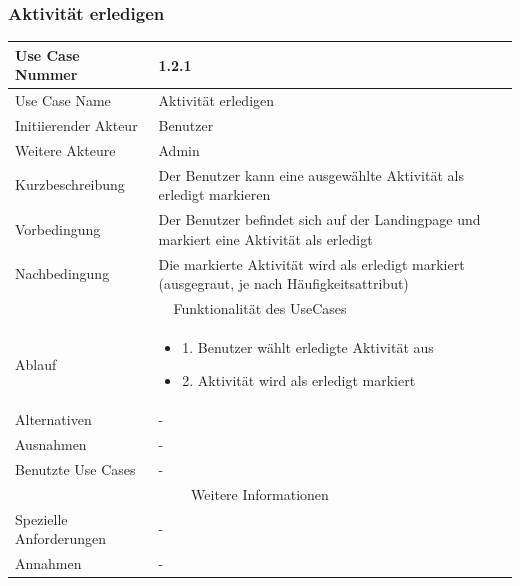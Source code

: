 \documentclass[10pt,a4paper]{article}
\begin{document}
		\subsubsection{Aktivität erledigen}
		\begin{tabular}{|l|p{.5\linewidth}|}
			\hline Use Case Nummer & 1.2.1 \\ 
			\hline Use Case Name & Aktivität erledigen \\ 
			\hline Initiierender Akteur & Benutzer \\
			\hline Weitere Akteure & Admin \\
			\hline Kurzbeschreibung & Der Benutzer kann eine ausgewählte Aktivität als erledigt markieren \\
			\hline Vorbedingung & Der Benutzer befindet sich auf der Landingpage und markiert eine Aktivität als erledigt \\
			\hline Nachbedingung & Die markierte Aktivität wird als erledigt markiert (ausgegraut, je nach Häufigkeitsattribut) \\
			\hline \multicolumn{2}{|c|}{Funktionalität des UseCases}\\
			\hline Ablauf & \begin{itemize}
				\item 1. Benutzer wählt erledigte Aktivität aus
				\item 2. Aktivität wird als erledigt markiert
			\end{itemize} \\
			\hline Alternativen & - \\
			\hline Ausnahmen & - \\
			\hline Benutzte Use Cases & - \\
			\hline \multicolumn{2}{|c|}{Weitere Informationen} \\
			\hline Spezielle Anforderungen & - \\
			\hline Annahmen & - \\
			\hline
		\end{tabular}
		
\end{document}
